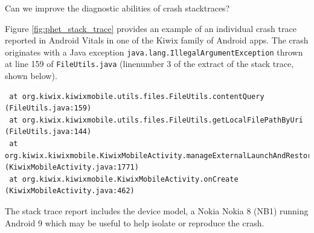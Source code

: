Can we improve the diagnostic abilities of crash stacktraces? 

Figure \ref{fig:phet_stack_trace} provides an example of an individual crash trace reported in Android Vitals in one of the Kiwix family of Android apps. The crash originates with a Java exception \texttt{java.lang.IllegalArgumentException} thrown at line 159 of \texttt{FileUtils.java} (linenumber 3 of the extract of the stack trace, shown below). 



\begin{lstlisting}
 at org.kiwix.kiwixmobile.utils.files.FileUtils.contentQuery (FileUtils.java:159)
 at org.kiwix.kiwixmobile.utils.files.FileUtils.getLocalFilePathByUri (FileUtils.java:144) 
 at org.kiwix.kiwixmobile.KiwixMobileActivity.manageExternalLaunchAndRestoringViewState (KiwixMobileActivity.java:1771)
 at org.kiwix.kiwixmobile.KiwixMobileActivity.onCreate (KiwixMobileActivity.java:462)
\end{lstlisting}

The stack trace report includes the device model, a Nokia Nokia 8 (NB1) running Android 9 which may be useful to help isolate or reproduce the crash. 

